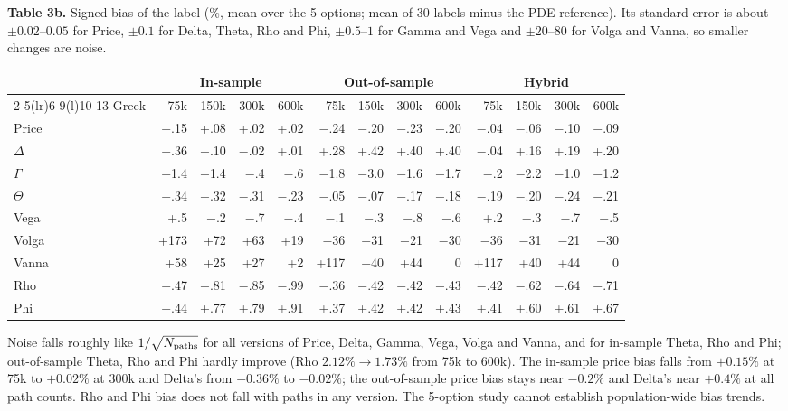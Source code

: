 \documentclass[10pt,letterpaper]{article}
\begin{document}
\textbf{Table 3b.} Signed bias of the label (\%, mean over the 5 options; mean of 30 labels minus the PDE
reference). Its standard error is about $\pm0.02$--$0.05$ for Price, $\pm0.1$ for Delta, Theta, Rho and Phi,
$\pm0.5$--$1$ for Gamma and Vega and $\pm20$--$80$ for Volga and Vanna, so smaller changes are noise.
\begin{center}
\fontsize{7.9}{9.2}\selectfont
\setlength{\tabcolsep}{3.3pt}
\begin{tabular}{@{}lrrrrrrrrrrrr@{}}
\toprule
& \multicolumn{4}{c}{In-sample} & \multicolumn{4}{c}{Out-of-sample} & \multicolumn{4}{c}{Hybrid}\\
\cmidrule(lr){2-5}\cmidrule(lr){6-9}\cmidrule(l){10-13}
Greek & 75k & 150k & 300k & 600k & 75k & 150k & 300k & 600k & 75k & 150k & 300k & 600k\\
\midrule
Price & +.15 & +.08 & +.02 & +.02 & $-$.24 & $-$.20 & $-$.23 & $-$.20 & $-$.04 & $-$.06 & $-$.10 & $-$.09 \\
$\Delta$ & $-$.36 & $-$.10 & $-$.02 & +.01 & +.28 & +.42 & +.40 & +.40 & $-$.04 & +.16 & +.19 & +.20 \\
$\Gamma$ & +1.4 & $-$1.4 & $-$.4 & $-$.6 & $-$1.8 & $-$3.0 & $-$1.6 & $-$1.7 & $-$.2 & $-$2.2 & $-$1.0 & $-$1.2 \\
$\Theta$ & $-$.34 & $-$.32 & $-$.31 & $-$.23 & $-$.05 & $-$.07 & $-$.17 & $-$.18 & $-$.19 & $-$.20 & $-$.24 & $-$.21 \\
Vega & +.5 & $-$.2 & $-$.7 & $-$.4 & $-$.1 & $-$.3 & $-$.8 & $-$.6 & +.2 & $-$.3 & $-$.7 & $-$.5 \\
Volga & +173 & +72 & +63 & +19 & $-$36 & $-$31 & $-$21 & $-$30 & $-$36 & $-$31 & $-$21 & $-$30 \\
Vanna & +58 & +25 & +27 & +2 & +117 & +40 & +44 & 0 & +117 & +40 & +44 & 0 \\
Rho & $-$.47 & $-$.81 & $-$.85 & $-$.99 & $-$.36 & $-$.42 & $-$.42 & $-$.43 & $-$.42 & $-$.62 & $-$.64 & $-$.71 \\
Phi & +.44 & +.77 & +.79 & +.91 & +.37 & +.42 & +.42 & +.43 & +.41 & +.60 & +.61 & +.67 \\
\bottomrule
\end{tabular}
\end{center}

Noise falls roughly like $1/\sqrt{N_{\rm paths}}$ for all versions of Price, Delta, Gamma, Vega, Volga
and Vanna, and for in-sample Theta, Rho and Phi; out-of-sample Theta, Rho and Phi hardly improve
(Rho $2.12\%\rightarrow1.73\%$ from 75k to 600k). The in-sample price bias falls from $+0.15\%$ at 75k to
$+0.02\%$ at 300k and Delta's from $-0.36\%$ to $-0.02\%$; the out-of-sample price bias stays near
$-0.2\%$ and Delta's near $+0.4\%$ at all path counts. Rho and Phi bias does not fall with paths in any
version. The 5-option study cannot establish population-wide bias trends.
\end{document}
